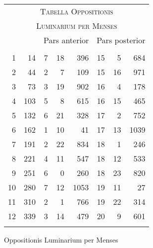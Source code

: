 %
\begin{tabnums} %
\footnotesize
\centering
\setlength{\tabcolsep}{1.0ex}
%
\newcommand{\cwd}{3.2em}
\newcommand{\da}{{\tiny †}}
\newcommand{\db}{{\scriptsize o}}
\newcommand{\ang}{90}
\newcommand{\hsb}[1]{\footnotesize{#1}}
\newcommand{\hsa}[1]{\tiny{#1}}
%
\newcommand{\hdrB}{%
  ~ & ~ &
  \multicolumn{3}{c}{\hsb{Pars anterior}} &
  \multicolumn{3}{c}{\hsb{Pars posterior}}  
}
%
\newcommand{\hdrA}{%
  \ch{\hsa{Men-}}{\hsa{Men\-ses}} &
  \ch{\hsa{men-}}{\hsa{Dies mensium}} &
  \ch{\hsa{Feria}}{\hsa{Feria}}&
  \ch{\hsa{Hor.}}{\hsa{Hor.}} &
  \ch{\hsa{Scrup.}}{\hsa{Scrup.}} &
  \ch{\hsa{Dies}}{\hsa{Dies}} &
  \ch{\hsa{Hor.}}{\hsa{Hor.}} &
  \ch{\hsa{Scrup.}}{\hsa{Scrup.}}
}
%
\newcommand{\hdrs}{%
\hdrB \\
\cmidrule(lr){3-5} \cmidrule(lr){6-8}
\hdrA \\
}
%
\begin{tabular}[c]{@{} r r rrr rrr @{}}
\toprule
\multicolumn{8}{c}{\large\textsc{Tabella Oppositionis}} \\
\multicolumn{8}{c}{\normalsize\textsc{Luminarium per Menses}} \\
\toprule
\hdrs %
\midrule
  1 &  14 &  7 & 18 &  396 & 15 &  5 &  684 \\
  2 &  44 &  2 &  7 &  109 & 15 & 16 &  971 \\
  3 &  73 &  3 & 19 &  902 & 16 &  4 &  178 \\
  4 & 103 &  5 &  8 &  615 & 16 & 15 &  465 \\
  5 & 132 &  6 & 21 &  328 & 17 &  2 &  752 \\
  6 & 162 &  1 & 10 &   41 & 17 & 13 & 1039 \\
  7 & 191 &  2 & 22 &  834 & 18 &  1 &  246 \\
  8 & 221 &  4 & 11 &  547 & 18 & 12 &  533 \\
  9 & 251 &  6 &  0 &  260 & 18 & 23 &  820 \\
 10 & 280 &  7 & 12 & 1053 & 19 & 11 &   27 \\
 11 & 310 &  2 &  1 &  766 & 19 & 22 &  314 \\
 12 & 339 &  3 & 14 &  479 & 20 &  9 &  601 \\
\bottomrule
\addlinespace[5pt]
\end{tabular}
\caption{Oppositionis Luminarium per Menses}
\label{tab:p203b}
\end{tabnums}
